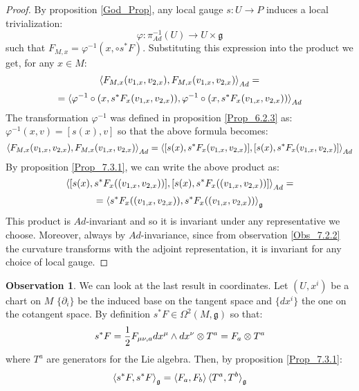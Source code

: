 \documentclass[12pt,a4paper]{report}
\theoremstyle{definition}
\theoremstyle{Theorem}
\theoremstyle{definition}
\theoremstyle{definition}
\newtheorem{Obs}[Def]{Observation}
\begin{document}
	\begin{proof}
		By proposition \ref{God_Prop}, any local gauge $s:U\rightarrow P$ induces a local trivialization:
		$$\varphi: \pi^{-1}_{Ad}(U)\rightarrow U\times \mathfrak{g}$$
		such that $F_{M,x}=\varphi^{-1}(x,\circ s^*F)$.
		Substituting this expression into the product we get, for any $x\in M$:
		$$\braket{F_{M,x}(v_{1,x},v_{2,x}),F_{M,x}(v_{1,x},v_{2,x})}_{Ad}=$$
		$$=\braket{\varphi^{-1}\circ (x,s^*F_x(v_{1,x},v_{2,x})),\varphi^{-1}\circ (x,s^*F_x(v_{1,x},v_{2,x}))}_{Ad}$$
		The transformation $\varphi^{-1}$ was defined in proposition \ref{Prop_6.2.3} as: $\varphi^{-1}(x,v)=[s(x),v]$ so that the above formula becomes:
		$$\braket{F_{M,x}(v_{1,x},v_{2,x}),F_{M,x}(v_{1,x},v_{2,x})}_{Ad}=\braket{[s(x),s^*F_x(v_{1,x},v_{2,x})],[s(x),s^*F_x(v_{1,x},v_{2,x})]}_{Ad}$$
		By proposition \ref{Prop_7.3.1}, we can write the above product as:
		$$\braket{[s(x),s^*F_x((v_{1,x},v_{2,x}))],[s(x),s^*F_x((v_{1,x},v_{2,x}))]}_{Ad}=$$
		$$=\braket{s^*F_x((v_{1,x},v_{2,x})),s^*F_x((v_{1,x},v_{2,x}))}_\mathfrak{g}$$
		This product is $Ad$-invariant and so it is invariant under any representative we choose. Moreover, always by $Ad$-invariance, since from observation \ref{Obs_7.2.2} the curvature transforms with the adjoint representation, it is invariant for any choice of local gauge.
	\end{proof}
	\begin{Obs}\label{Obs_7.3.2}
		We can look at the last result in coordinates. Let $(U,x^i)$ be a chart on $M$ $\{\partial_i\}$ be the induced base on the tangent space and $\{dx^i\}$ the one on the cotangent space. By definition $s^*F\in \Omega^2(M,\mathfrak{g})$ so that:
		$$s^*F={1\over 2}F_{\mu\nu,a}dx^\mu\wedge dx^\nu\otimes T^a=F_a\otimes T^a$$
		where $T^a$ are generators for the Lie algebra. Then, by proposition \ref{Prop_7.3.1}:
		$$\braket{s^*F,s^*F}_\mathfrak{g}=\braket{F_a,F_b}\braket{T^a,T^b}_\mathfrak{g}$$
	\end{Obs}
\end{document}
